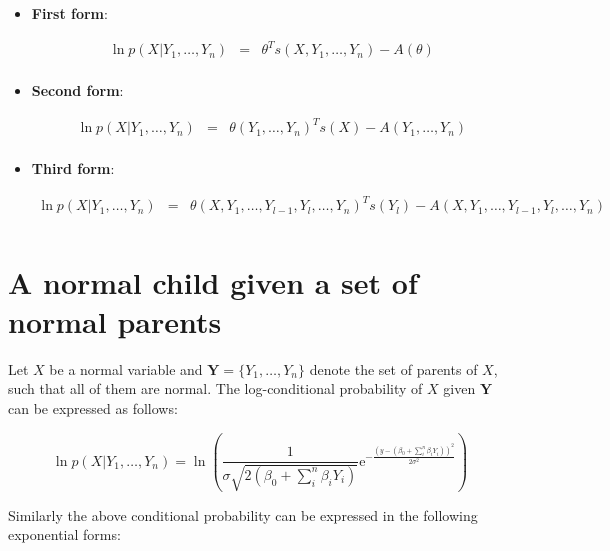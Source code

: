 \documentclass[11pt, oneside]{article}   	%
\newcommand{\me}{\mathrm{e}}
\numberwithin{figure}{section}
\numberwithin{equation}{section}
\numberwithin{table}{section}
\begin{document}
\begin{itemize}
\item \textbf{First form}:

\begin{eqnarray*}
\ln p(X|Y_1,\ldots ,Y_n) &=& \theta^Ts(X,Y_1,\ldots ,Y_n) - A(\theta) \\
\end{eqnarray*}

\item \textbf{Second form}:


\begin{eqnarray*}
\ln p(X|Y_1,\ldots ,Y_n) &=& \theta(Y_1,\ldots ,Y_n)^Ts(X) - A(Y_1,\ldots ,Y_n) \\
\end{eqnarray*}

\item \textbf{Third form}:

\begin{eqnarray*}
\ln p(X|Y_1,\ldots ,Y_n) &=& \theta(X, Y_1,\ldots ,Y_{l-1},Y_l, \ldots ,Y_n)^T s(Y_l) - A(X, Y_1,\ldots ,Y_{l-1},Y_l, \ldots ,Y_n) \\
\end{eqnarray*}

\end{itemize}

\newpage
\section{A normal child given a set of normal parents}

Let $X$ be a normal variable and $ \mathbf{Y} = \{Y_1,\ldots,Y_n\}$ denote the set of parents of $X$, such that all of them are normal. The log-conditional probability of $X$ given $\mathbf{Y}$ can be expressed as follows:

$$ \ln p(X|Y_1,\ldots,Y_n) = \ln \left(\frac{1}{\sigma \sqrt{2(\beta_0+\sum_i^n \beta_i Y_i )}} \me^{-\frac{(y-(\beta_0+\sum_i^n \beta_i Y_i))^2}{2\sigma^2}} \right)$$


Similarly the above conditional probability can be expressed in the following exponential forms:
\end{document}
